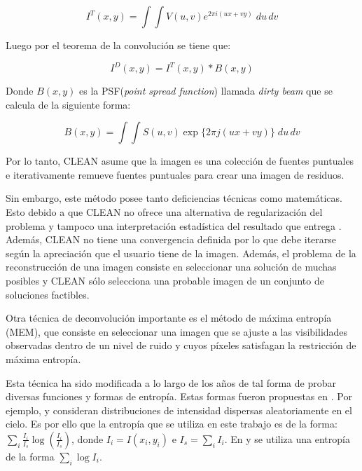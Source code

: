\begin{equation}
I^{T}(x,y) = \int\int V(u,v)e^{2\pi i(ux+vy)}\;du\,dv
\label{eq:fullcoverage}
\end{equation} 

Luego por el teorema de la convolución se tiene que:

\begin{equation}
I^{D}(x,y) = I^{T}(x,y) \ast B(x,y)
\end{equation}

Donde $B(x,y)$ es la PSF(\textit{point spread function}) llamada \textit{dirty beam} que se calcula de la siguiente forma:

\begin{equation}
B(x,y) = \int\int S(u,v) \exp\{2\pi j(ux+vy)\} \;du\,dv
\end{equation}

Por lo tanto, CLEAN asume que la imagen es una colección de fuentes puntuales e iterativamente remueve fuentes puntuales para crear una imagen de residuos.

Sin embargo, este método posee tanto deficiencias técnicas como matemáticas. Esto debido a que CLEAN no ofrece una alternativa de regularización del problema y tampoco una interpretación estadística del resultado que entrega \citep{libroAstro2}. Además, CLEAN no tiene una convergencia definida por lo que debe iterarse según la apreciación que el usuario tiene de la imagen. Además, el problema de la reconstrucción de una imagen consiste en seleccionar una solución de muchas posibles y CLEAN sólo selecciona una probable imagen de un conjunto de soluciones factibles.
 
Otra técnica de deconvolución importante es el método de máxima entropía (MEM), que consiste en seleccionar una imagen que se ajuste a las visibilidades observadas dentro de un nivel de ruido y cuyos píxeles satisfagan la restricción de máxima entropía.

Esta técnica ha sido modificada a lo largo de los años de tal forma de probar diversas funciones y formas de entropía. Estas formas fueron propuestas en \citep{FRIEDEN:72, themaxen, memsan, daddario}. Por ejemplo, \citep{FRIEDEN:72} y \citep{themaxen} consideran distribuciones de intensidad dispersas aleatoriamente en el cielo. Es por ello que la entropía que se utiliza en este trabajo es de la forma: $\sum_{i}\frac{I_{i}}{I_{s}}\log(\frac{I_{i}}{I_{s}})$, donde $I_{i}=I(x_{i}, y_{i})$ e $I_{s}=\sum_{i}I_{i}$. En \citep{memsan} y \citep{daddario} se utiliza una entropía de la forma $\sum_{i}\log I_{i}$.


